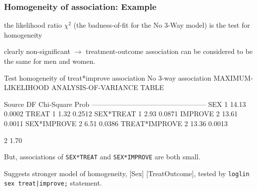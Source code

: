 \begin{frame}[fragile]
  \frametitle{Homogeneity of association: Example}
  \begin{itemize*}
  \item the likelihood ratio \(\chi^2\) (the
badness-of-fit for the No 3-Way model) is the test for homogeneity
  \item clearly non-significant $\rightarrow$
treatment-outcome association can be considered to be the same for
men and women.
  \end{itemize*}
\begin{Output}[baselinestretch=0.75]
      Test homogeneity of treat*improve association
                   No 3-way association
      MAXIMUM-LIKELIHOOD ANALYSIS-OF-VARIANCE TABLE

    Source                   DF   Chi-Square      Prob
    --------------------------------------------------
    SEX                       1        14.13    0.0002
    TREAT                     1         1.32    0.2512
    SEX*TREAT                 1         2.93    0.0871
    IMPROVE                   2        13.61    0.0011
    SEX*IMPROVE               2         6.51    0.0386
    TREAT*IMPROVE             2        13.36    0.0013

              2         1.70    
\end{Output}
  \begin{itemize*}
  \item But, associations of \texttt{SEX*TREAT} and \texttt{SEX*IMPROVE}
  are both small.
  \item Suggests stronger model of homogeneity, [Sex] [TreatOutcome],
  tested by \texttt{loglin sex treat|improve;} statement.
  \end{itemize*}

\end{frame}

